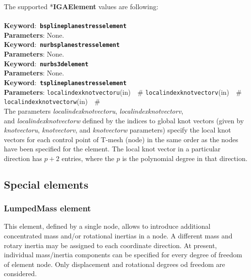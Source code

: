 \documentclass[a4paper]{article}
\newcommand{\descitem}[1]{{\noindent \bf #1}:}
\newcommand{\elemkeyword}[1]{\descitem{Keyword}~{\bf \texttt{#1}}}
\newcommand{\elemparam}[2]{{{\texttt{#1}\tiny (#2)}~~\#}}
\newcommand{\param}[1]{{\em #1}}
\newcommand{\entKeyword}[1]{\mbox{{*{\bf{#1}}}}}
\begin{document}
The supported \entKeyword{IGAElement} values are following:\\\\
\elemkeyword{bsplineplanestresselement}\\
\descitem{Parameters} None.\\
\elemkeyword{nurbsplanestresselement}\\
\descitem{Parameters} None.\\
\elemkeyword{nurbs3delement}\\
\descitem{Parameters} None.\\
\elemkeyword{tsplineplanestresselement}\\
\descitem{Parameters} \elemparam{localindexknotvectoru}{in} \elemparam{localindexknotvectorv}{in} \elemparam{localindexknotvectorw}{in}\\
The parameters \param{localindexknotvectoru}, \param{localindexknotvectorv},\\ and \param{localindexknotvectorw} defined by the indices to global knot vectors (given by \param{knotvectoru}, \param{knotvectorv}, and \param{knotvectorw} parameters) specify the local knot vectors for each control point of T-mesh (node) in the same order as the nodes have been specified for the element. The local knot vector in a particular direction has $p+2$ entries, where the $p$ is the polynomial degree in that direction.



\subsection{Special elements}
\subsubsection{LumpedMass element}
This element, defined by a single node, allows to introduce additional concentrated mass and/or rotational inertias in a node.
A different mass and rotary inertia may be assigned to each coordinate direction. At present, individual mass/inertia components can be specified for  every degree of freedom of element node. Only displacement and rotational degrees od freedom are considered. 
\end{document}
